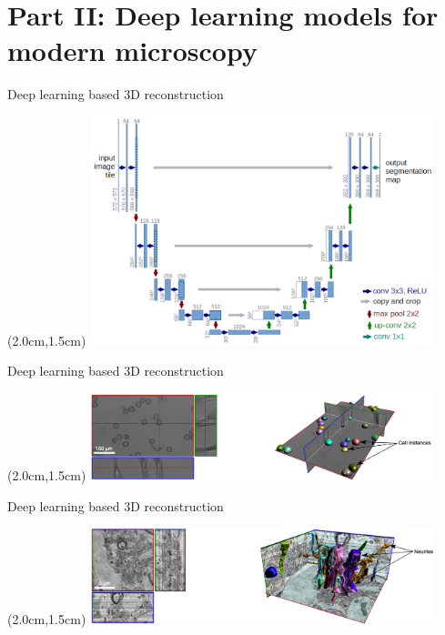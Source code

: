 \documentclass{beamer}					%
\begin{document}

\section{Part II: Deep learning models for modern microscopy}

\begin{frame}{Deep learning based 3D reconstruction}
\begin{textblock*}{10cm}(2.0cm,1.5cm)
\includegraphics[width=10cm]{../../postdoc/sartorius/media/Arch.png}
\end{textblock*}
\end{frame}


\begin{frame}{Deep learning based 3D reconstruction}
\begin{textblock*}{10cm}(2.0cm,1.5cm)
\includegraphics[width=10cm]{../../postdoc/sartorius/media/UNET-1.png}
\end{textblock*}
\end{frame}

\begin{frame}{Deep learning based 3D reconstruction}
\begin{textblock*}{10cm}(2.0cm,1.5cm)
\includegraphics[width=10cm]{../../postdoc/sartorius/media/UNET-2.png}
\end{textblock*}
\end{frame}
\end{document}
